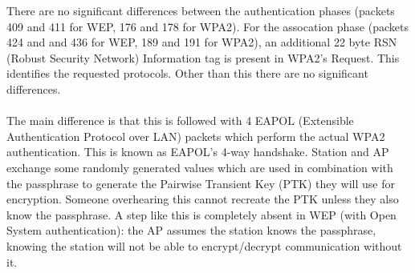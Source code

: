 There are no significant differences between the authentication phases (packets 409 and 411 for WEP, 176 and 178 for WPA2). For the assocation phase (packets 424 and and 436 for WEP, 189 and 191 for WPA2), an additional 22 byte RSN (Robust Security Network) Information tag is present in WPA2's Request. This identifies the requested protocols. Other than this there are no significant differences. \\ \\The main difference is that this is followed with 4 EAPOL (Extensible Authentication Protocol over LAN) packets which perform the actual WPA2 authentication. This is known as EAPOL's 4-way handshake. Station and AP exchange some randomly generated values which are used in combination with the passphrase to generate the Pairwise Transient Key (PTK) they will use for encryption. Someone overhearing this cannot recreate the PTK unless they also know the passphrase. A step like this is completely absent in WEP (with Open System authentication): the AP assumes the station knows the passphrase, knowing the station will not be able to encrypt/decrypt communication without it.
